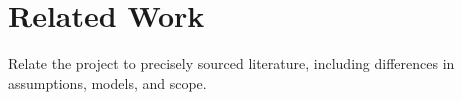 \section{Related Work}
\label{sec:related-work}

Relate the project to precisely sourced literature, including differences in
assumptions, models, and scope.

